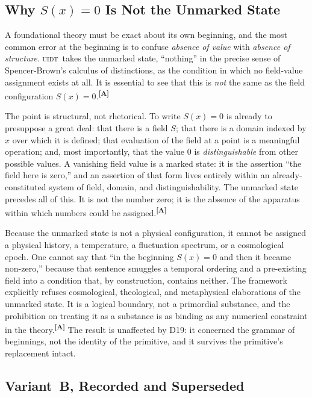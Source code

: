 \documentclass[12pt,a4paper,twoside]{article}
\theoremstyle{plain}
\theoremstyle{definition}
\theoremstyle{remark}
\newcommand{\UIDT}{\textsc{uidt}} %
\newcommand{\catmark}[1]{\textsuperscript{\textsf{\textbf{[#1]}}}}
\begin{document}
\subsection{Why \texorpdfstring{$S(x)=0$}{S(x)=0} Is Not the Unmarked State}
\label{subsec:sx-zero-not-unmarked}

A foundational theory must be exact about its own beginning, and the
most common error at the beginning is to confuse \emph{absence of value}
with \emph{absence of structure}. \UIDT\ takes the unmarked state,
``nothing'' in the precise sense of Spencer-Brown's calculus of
distinctions, as the condition in which no field-value assignment exists
at all. It is essential to see that this is \emph{not} the same as the
field configuration $S(x) = 0$.\catmark{A}

The point is structural, not rhetorical. To write $S(x) = 0$ is already
to presuppose a great deal: that there is a field $S$; that there is a
domain indexed by $x$ over which it is defined; that evaluation of the
field at a point is a meaningful operation; and, most importantly, that
the value $0$ is \emph{distinguishable} from other possible values. A
vanishing field value is a marked state: it is the assertion ``the field
here is zero,'' and an assertion of that form lives entirely within an
already-constituted system of field, domain, and distinguishability. The
unmarked state precedes all of this. It is not the number zero; it is
the absence of the apparatus within which numbers could be
assigned.\catmark{A}

Because the unmarked state is not a physical configuration, it cannot be
assigned a physical history, a temperature, a fluctuation spectrum, or a
cosmological epoch. One cannot say that ``in the beginning $S(x)=0$ and
then it became non-zero,'' because that sentence smuggles a temporal
ordering and a pre-existing field into a condition that, by
construction, contains neither. The framework explicitly refuses
cosmological, theological, and metaphysical elaborations of the unmarked
state. It is a logical boundary, not a primordial substance, and the
prohibition on treating it as a substance is as binding as any numerical
constraint in the theory.\catmark{A} The result is unaffected by D19:
it concerned the grammar of beginnings, not the identity of the
primitive, and it survives the primitive's replacement intact.

\subsection{Variant~B, Recorded and Superseded}
\label{subsec:variant-b}
\end{document}
